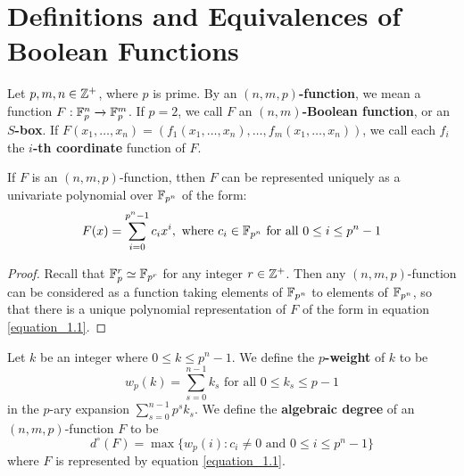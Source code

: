 \section{Definitions and Equivalences of Boolean Functions}\label{section_1.1}

\begin{definition}
  Let $p,m, n \in \mathbb{Z}^+$, where $p$ is prime. By an \textbf{$(n,m,p)$-function},
  we mean a function $F:\mathbb{F}_p^n \xrightarrow{} \mathbb{F}_p^m$. If $p=2$, we call $F$ an
  \textbf{$(n,m)$-Boolean function}, or an \textbf{$S$-box}. If
  $F(x_1, \dots, x_n)=(f_1(x_1, \dots, x_n), \dots, f_m(x_1, \dots, x_n))$, we
  call each $f_i$ the \textbf{$i$-th coordinate} function of $F$.
\end{definition}

\begin{lemma}\label{lemma_1.1.1}
  If $F$ is an  $(n,m,p)$-function, tthen $F$ can be represented uniquely as a
  univariate polynomial over  $\mathbb{F}_{p^n}$ of the form:
  \begin{equation}\label{equation_1.1}
    F(x)=\sum_{i=0}^{p^n-1}{c_ix^i},  \text{ where } c_i \in \mathbb{F}_{p^n}
    \text{ for all } 0 \leq i \leq p^n-1
  \end{equation}
\end{lemma}
\begin{proof}
  Recall that $\mathbb{F}_p^r \simeq \mathbb{F}_{p^r}$ for any integer $r \in \mathbb{Z}^+$. Then any
  $(n,m,p)$-function can be considered as a function taking elements of
  $\mathbb{F}_{p^n}$ to elements of $\mathbb{F}_{p^n}$, so that there is a unique polynomial
  representation of $F$ of the form in equation \ref{equation_1.1}.
\end{proof}

\begin{defintion}
  Let $k$ be an integer where $0 \leq k \leq p^n-1$. We define the
  \textbf{$p$-weight} of $k$ to be
  \begin{equation}\label{equation_1.2}
    w_p(k)=\sum_{s=0}^{n-1}{k_s} \text{ for all } 0 \leq k_s \leq p-1
  \end{equation}
  in the $p$-ary expansion  $\sum_{s=0}^{n-1}{p^sk_s}$. We define the
  \textbf{algebraic degree} of an $(n,m,p)$-function $F$ to be
  \begin{equation}\label{equation_2.3}
    d^\circ(F)=\max{\{w_p(i) : c_i \neq 0 \text{ and } 0 \leq i \leq p^n-1\}}
  \end{equation}
  where $F$ is represented by equation \ref{equation_1.1}.
\end{defintion}

